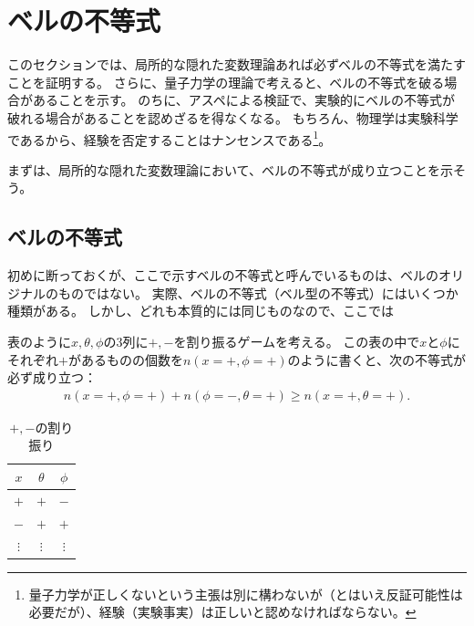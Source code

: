 \documentclass[10pt,b5paper,papersize,dvipdfmx]{jsbook}
\begin{document}
\fi
\ifsecII
\section{ベルの不等式}

このセクションでは、局所的な隠れた変数理論あれば必ずベルの不等式を満たすことを証明する。
さらに、量子力学の理論で考えると、ベルの不等式を破る場合があることを示す。
のちに、アスペによる検証で、実験的にベルの不等式が破れる場合があることを認めざるを得なくなる。
もちろん、物理学は実験科学であるから、経験を否定することはナンセンスである\footnote{
  量子力学が正しくないという主張は別に構わないが（とはいえ反証可能性は必要だが）、経験（実験事実）は正しいと認めなければならない。
}。\par
まずは、局所的な隠れた変数理論において、ベルの不等式が成り立つことを示そう。

%
\subsection{ベルの不等式} %

初めに断っておくが、ここで示すベルの不等式と呼んでいるものは、ベルのオリジナルのものではない。
実際、ベルの不等式（ベル型の不等式）にはいくつか種類がある。
しかし、どれも本質的には同じものなので、ここでは

表のように$x, \theta, \phi$の3列に$+, -$を割り振るゲームを考える。
この表の中で$x$と$\phi$にそれぞれ$+$があるものの個数を$n(x=+,\phi=+)$のように書くと、次の不等式が必ず成り立つ：
\begin{align*}
  n(x=+,\phi=+) + n(\phi=-,\theta=+) \ge n(x=+,\theta=+).
\end{align*}

\begin{table}[htbp]
  \centering
  \caption{$+, -$の割り振り}
  \begin{tabular}{ccc} \hline
    $x$ & $\theta$ & $\phi$ \\ \hline
    $+$ & $+$ & $-$ \\
    $-$ & $+$ & $+$ \\
    $\vdots$ & $\vdots$ & $\vdots$ \\ \hline
  \end{tabular}
\end{table}
\end{document}
